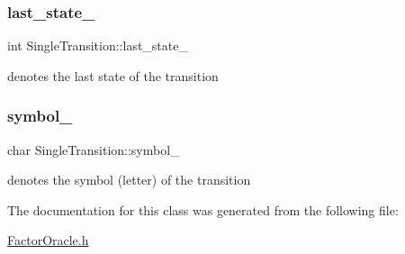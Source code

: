 \subsubsection{\texorpdfstring{last\_state\_}{last\_state\_}}
{\footnotesize\ttfamily int Single\+Transition\+::last\+\_\+state\+\_\+}

denotes the last state of the transition \mbox{\label{class_single_transition_ae632ebd30fd4818e999fd1009cb2a8f9}} 
\subsubsection{\texorpdfstring{symbol\_}{symbol\_}}
{\footnotesize\ttfamily char Single\+Transition\+::symbol\+\_\+}

denotes the symbol (letter) of the transition 

The documentation for this class was generated from the following file\+:\begin{DoxyCompactItemize}
\item 
\mbox{\hyperlink{_factor_oracle_8h}{Factor\+Oracle.\+h}}\end{DoxyCompactItemize}

